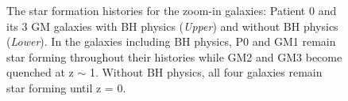 \documentclass[]{emulateapj}
\begin{document}
\begin{figure}[h!]
\centerline{}
\vspace{-1mm}
\centerline{}
\caption[]{The star formation histories for the zoom-in galaxies: Patient 0 and its 3 GM galaxies with BH physics (\textit{Upper}) and without BH physics (\textit{Lower}). In the galaxies including BH physics, P0 and GM1 remain star forming throughout their histories while GM2 and GM3 become quenched at z $\sim$ 1. Without BH physics, all four galaxies remain star forming until z = 0.}
\label{fig-sfh}
\end{figure}
\end{document}
